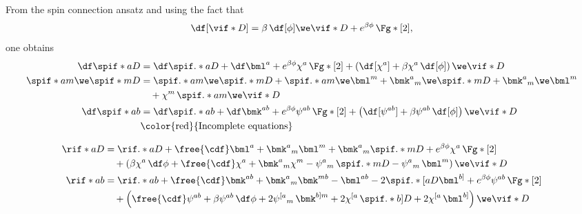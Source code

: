From the spin connection ansatz and using the fact that
\begin{equation}
  \df[\vif*{D}] = \beta \, \df[\phi] \we \vif*{D} + e^{\beta \phi} \, \Fg*[2],
\end{equation}
one obtains
\begin{align}
  \df \spif*{a D}{} &= \df \spif.*{a D}{} + \df \bml^a + e^{\beta \phi} \chi^a \, \Fg*[2] + \left( \df[\chi^a] + \beta \chi^a \, \df[\phi] \right) \we \vif*{D} \\
  \spif*{a}{m} \we \spif*{m D}{} &= \spif.*{a}{m} \we \spif.*{m D}{} + \spif.*{a}{m} \we \bml^m + \bmk^a{}_m \we \spif.*{m D}{} + \bmk^{a}{}_m \we \bml^m \\
  & \quad + \chi^m \, \spif.*{a}{m} \we \vif*{D} \\
  \df \spif*{a b}{} &= \df \spif.*{a b}{} + \df \bmk^{ab} + e^{\beta \phi} \psi^{ab} \, \Fg*[2] + \left( \df[\psi^{ab}] + \beta \psi^{ab} \, \df[\phi] \right) \we \vif*{D} \\
  &\text{\color{red}{Incomplete equations}}
\end{align}

\begin{align}
  \rif*{a D}{} &= \rif.*{a D}{} + \free{\cdf} \bml^a + \bmk^{a}{}_m \bml^m + \bmk^{a}{}_m \spif.*{m D}{} + e^{\beta \phi} \chi^a \, \Fg*[2] \\
  & \quad + \left( \beta \chi^a \, \df\phi + \free{\cdf} \chi^a + \bmk^a{}_m \chi^m - \psi^a{}_m \, \spif.*{m D}{} - \psi^a{}_m \, \bml^m \right) \we \vif*{D} \notag \\
  \rif*{a b}{} &= \rif.*{a b}{} + \free{\cdf}\bmk^{ab} + \bmk^a{}_m \bmk^{mb} - \bml^{ab} - 2 \spif.*{[a}{D} \bml^{b]} + e^{\beta \phi} \psi^{ab} \, \Fg*[2] \\
  & \quad + \left( \free{\cdf}\psi^{ab} + \beta \psi^{ab} \, \df \phi + 2 \psi^{[a}{}_m \, \bmk^{b] m} + 2 \chi^{[a} \, \spif.*{b] D}{} + 2 \chi^{[a} \, \bml^{b]} \right) \we \vif*{D} \notag
\end{align}


\nocite{German:1993bq,Aros:2007nn}
\nocite{MuellerHoissen:1989yv,Mardones:1990qc}
